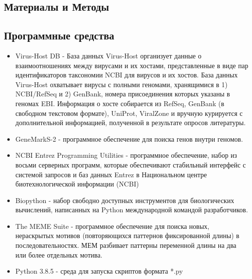 \documentclass[a4paper,12pt]{article}
\begin{document}
\newpage
\begin{center}
\item \section{Материалы и Методы} \label{sec:code}
\item \subsection{Программные средства}
\end{center}
\begin{itemize}
    \item Virus-Host DB - База данных Virus-Host организует данные о взаимоотношениях между вирусами и их хостами,
    представленные в виде пар идентификаторов таксономии NCBI для вирусов и их хостов. База данных Virus-Host охватывает
    вирусы с полными геномами, хранящимися в 1) NCBI/RefSeq и 2) GenBank, номера присоединения которых указаны в геномах
    EBI. Информация о хосте собирается из RefSeq, GenBank (в свободном текстовом формате), UniProt, ViralZone и вручную
    курируется с дополнительной информацией, полученной в результате опросов литературы. \cite{virus-host}
    
    \item GeneMarkS-2 - программное обеспечение для поиска генов внутри геномов. \cite{lomsad}
    
    \item NCBI Entrez Programming Utilities - программное обеспечение, набор из восьми серверных программ, которые
    обеспечивают стабильный интерфейс с системой запросов и баз данных Entrez в Национальном центре биотехнологической
    информации (NCBI) \cite{entrez}
    
    \item Biopython - набор свободно доступных инструментов для биологических вычислений, написанных на Python
    международной командой разработчиков. \cite{biopython}
    
    \item The MEME Suite - программное обеспечение для поиска новых, нераскрытых мотивов (повторяющихся паттернов
    фиксированной длины) в последовательностях. МЕМ разбивает паттерны переменной длины на два или более отдельных
    мотива. \cite{bailey}
    
    \item Python 3.8.5 - среда для запуска скриптов формата *.py \cite{python}
    

\end{itemize}
\end{document}
